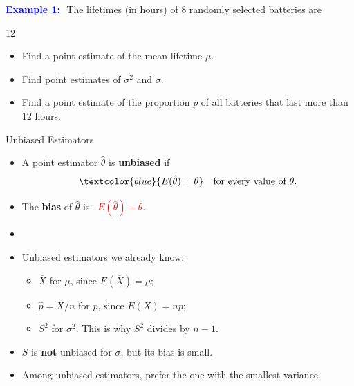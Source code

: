 \documentclass[12pt]{beamer}
\newcommand{\keyterm}[1]{\textcolor{examplegreen}{\textbf{#1}}}
\newcommand{\fitO}{}
\newcommand{\exlists}{\setlength{\itemsep}{0pt}}
\newcommand{\Xbar}{\overline{X}}
\newcommand{\thetahat}{\hat{\theta}}
\begin{document}
\begin{frame}[t]{}\fitO\exlists
\textcolor{blue}{\textbf{Example 1:}}\,\ The lifetimes (in hours) of 8 randomly selected batteries are
\begin{center}
12       
\end{center}
\begin{itemize}
\item[a)] Find a point estimate of the mean lifetime $\mu$.\\[0.2cm]
\end{itemize}
\end{frame}

\begin{frame}[t]{}\fitO\exlists
\begin{itemize}
\item[b)] Find point estimates of $\sigma^2$ and $\sigma$.\\[3.6cm]
\item[c)] Find a point estimate of the proportion $p$ of all batteries that last more than 12 hours.\\[0.2cm]
\end{itemize}
\end{frame}

\begin{frame}[t]{Unbiased Estimators}
\begin{itemize}
\item A point estimator $\thetahat$ is \keyterm{unbiased} if
\[
\textcolor{blue}{E(\thetahat)=\theta}\quad\text{for every value of }\theta.
\]
\item The \keyterm{bias} of $\thetahat$ is \ \textcolor{red}{$E(\thetahat)-\theta$}.
\item[]
\item Unbiased estimators we already know:
  \begin{itemize}
  \item $\Xbar$ for $\mu$, since $E(\Xbar)=\mu$;
  \item $\hat{p}=X/n$ for $p$, since $E(X)=np$;
  \item $S^2$ for $\sigma^2$. This is why $S^2$ divides by $n-1$.
  \end{itemize}
\item $S$ is \textbf{not} unbiased for $\sigma$, but its bias is small.
\item Among unbiased estimators, prefer the one with the smallest variance.
\end{itemize}
\end{frame}
\end{document}
